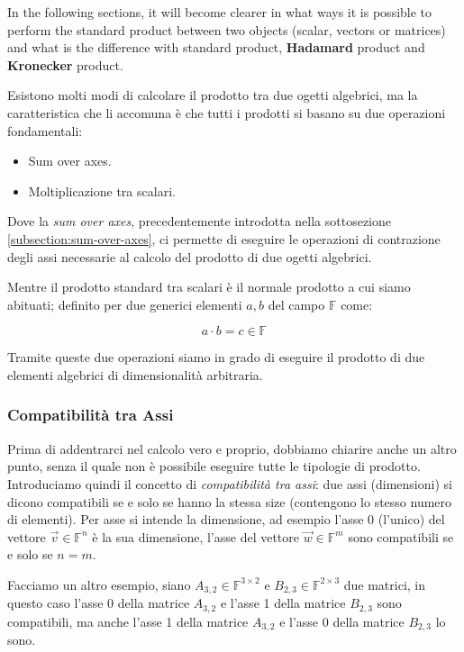 In the following sections, it will become clearer in what ways it is possible to perform the standard product between two objects (scalar, vectors or matrices) and what is the difference with standard product, \textbf{Hadamard} product and \textbf{Kronecker} product.

Esistono molti modi di calcolare il prodotto tra due ogetti algebrici, ma la caratteristica che li accomuna è che tutti i prodotti si basano su due operazioni fondamentali:

\begin{itemize}
    \item Sum over axes.
    \item Moltiplicazione tra scalari.
\end{itemize}

Dove la \textit{sum over axes}, precedentemente introdotta nella sottosezione \ref{subsection:sum-over-axes}, ci permette di eseguire le operazioni di contrazione degli assi necessarie al calcolo del prodotto di due ogetti algebrici.

Mentre il prodotto standard tra scalari è il normale prodotto a cui siamo abituati; definito per due generici elementi $a, b$ del campo $\mathbb{F}$ come:

$$
a \cdot b = c \in \mathbb{F}
$$

Tramite queste due operazioni siamo in grado di eseguire il prodotto di due elementi algebrici di dimensionalità arbitraria.

\subsubsection{Compatibilità tra Assi}

Prima di addentrarci nel calcolo vero e proprio, dobbiamo chiarire anche un altro punto, senza il quale non è possibile eseguire tutte le tipologie di prodotto. Introduciamo quindi il concetto di \textit{compatibilità tra assi}: due assi (dimensioni) si dicono compatibili se e solo se hanno la stessa size (contengono lo stesso numero di elementi). Per asse si intende la dimensione, ad esempio l'asse 0 (l'unico) del vettore $\vec v \in  \mathbb{F}^n$ è la sua dimensione, l'asse del vettore $\vec w \in \mathbb{F}^m$ sono compatibili se e solo se $n = m$. 

Facciamo un altro esempio, siano $A_{3, 2} \in \mathbb{F}^{3 \times 2}$ e $B_{2, 3} \in \mathbb{F}^{2 \times 3}$ due matrici, in questo caso l'asse 0 della matrice $A_{3,2}$ e l'asse 1 della matrice $B_{2, 3}$ sono compatibili, ma anche l'asse 1 della matrice $A_{3,2}$ e l'asse 0 della matrice $B_{2,3}$ lo sono.


